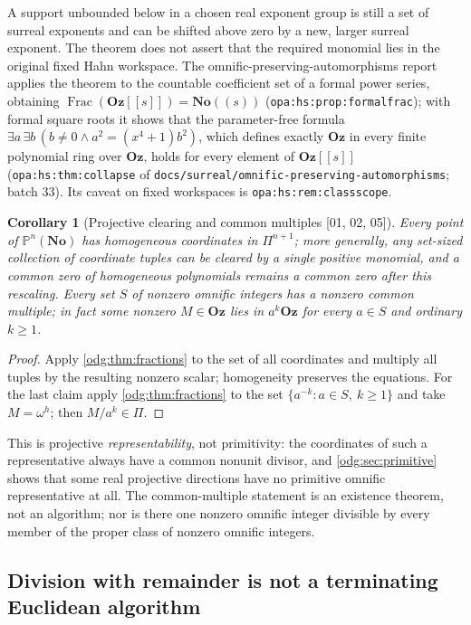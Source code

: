\documentclass[11pt,oneside]{article}
\numberwithin{equation}{section}
\newtheorem{corollary}[corollary]{Corollary}
\theoremstyle{definition}
\theoremstyle{remark}
\newcommand{\No}{\mathbf{No}}
\newcommand{\Oz}{\mathbf{Oz}}
\newcommand{\Frac}{\operatorname{Frac}}
\newcommand{\src}[1]{\textup{\textsf{\small[#1]}}}
\newcommand{\replabel}[1]{\nolinkurl{#1}}
\newcommand{\fn}[1]{\nolinkurl{#1}}
\begin{document}
A support unbounded below in a chosen real exponent group is still a set of
surreal exponents and can be shifted above zero by a new, larger surreal
exponent. The theorem does not assert that the required monomial lies in the
original fixed Hahn workspace.
The omnific-preserving-automorphisms report applies the theorem to the
countable coefficient set of a formal power series, obtaining
$\Frac(\Oz[[s]])=\No((s))$ (\replabel{opa:hs:prop:formalfrac}); with formal
square roots it shows that the parameter-free formula
$\exists a\,\exists b\,(b\ne0\wedge a^2=(x^4+1)b^2)$, which defines exactly
$\Oz$ in every finite polynomial ring over $\Oz$, holds for every element of
$\Oz[[s]]$ (\replabel{opa:hs:thm:collapse} of
\fn{docs/surreal/omnific-preserving-automorphisms}; batch 33). Its caveat on
fixed workspaces is \replabel{opa:hs:rem:classscope}.

\begin{corollary}[Projective clearing and common multiples \src{01, 02, 05}]\label{odg:cor:projectiveclear}\label{odg:cor:commonmultiples}
Every point of $\mathbb P^n(\No)$ has homogeneous coordinates in
$\Pi^{n+1}$; more generally, any set-sized collection of coordinate tuples
can be cleared by a single positive monomial, and a common zero of
homogeneous polynomials remains a common zero after this rescaling. Every
set $S$ of nonzero omnific integers has a nonzero common multiple; in fact
some nonzero $M\in\Oz$ lies in $a^k\Oz$ for every $a\in S$ and ordinary
$k\ge1$.
\end{corollary}
\begin{proof}
Apply \cref{odg:thm:fractions} to the set of all coordinates and multiply
all tuples by the resulting nonzero scalar; homogeneity preserves the
equations. For the last claim apply \cref{odg:thm:fractions} to the set
$\{a^{-k}:a\in S,\ k\ge1\}$ and take $M=\omega^h$; then $M/a^k\in\Pi$.
\end{proof}

This is projective \emph{representability}, not primitivity: the coordinates
of such a representative always have a common nonunit divisor, and
\cref{odg:sec:primitive} shows that some real projective directions have no
primitive omnific representative at all. The common-multiple statement is an
existence theorem, not an algorithm; nor is there one nonzero omnific integer
divisible by every member of the proper class of nonzero omnific integers.

\subsection{Division with remainder is not a terminating Euclidean algorithm}
\end{document}

